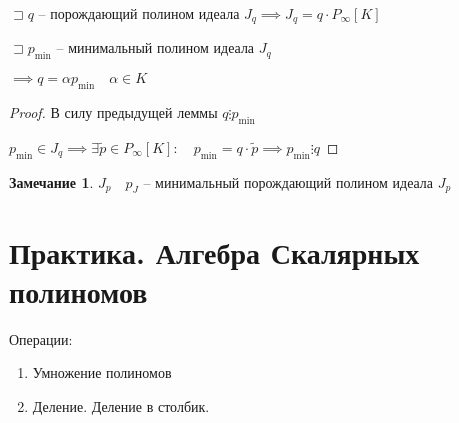 \documentclass{book}
\newcommand{\tl}[1]{\widetilde{#1}}
\theoremstyle{definition}
\newtheorem*{note}{Замечание}
\begin{document}
\begin{lemma}
    $\sqsupset q$ -- порождающий полином идеала $J_q \implies J_q = q \cdot  P_{\infty }[K]$

    $\sqsupset p_{\min}$ -- минимальный полином идеала $J_q$ 

    $\implies q = \alpha  p_{\min}\quad \alpha \in K$
\end{lemma}
\begin{proof}
    В силу предыдущей леммы $q \vdots p_{\min}$

    $p_{\min} \in J_q \implies \exists \tl p\in P_{\infty }[K]:\quad p_{\min} = q \cdot  \tl p \implies  p_{\min}\vdots q$
\end{proof}

\begin{note}
    $J_p\quad p_J$ -- минимальный порождающий полином идеала  $J_p$
\end{note}

\section{Практика. Алгебра Скалярных полиномов}

Операции:
\begin{enumerate}
    \item Умножение полиномов
    \item Деление. Деление в столбик.
\end{enumerate}
\end{document}
